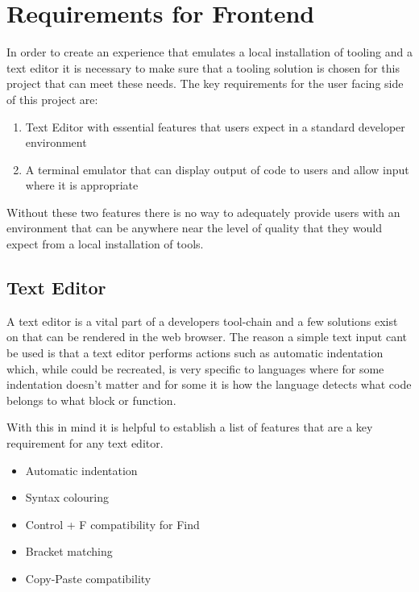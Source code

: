 \section{Requirements for Frontend} \label{solapp-frontend}

In order to create an experience that emulates a local installation of tooling and a text editor it is necessary to make sure that a tooling solution is chosen for this project that can meet these needs. The key requirements for the user facing side of this project are:

\begin{enumerate}
  \item Text Editor with essential features that users expect in a standard developer environment
  \item A terminal emulator that can display output of code to users and allow input where it is appropriate
\end{enumerate}

Without these two features there is no way to adequately provide users with an environment that can be anywhere near the level of quality that they would expect from a local installation of tools.

\subsection{Text Editor}

A text editor is a vital part of a developers tool-chain and a few solutions exist on that can be rendered in the web browser. The reason a simple text input cant be used is that a text editor performs actions such as automatic indentation which, while could be recreated, is very specific to languages where for some indentation doesn't matter and for some it is how the language detects what code belongs to what block or function.

With this in mind it is helpful to establish a list of features that are a key requirement for any text editor.

\begin{itemize}
  \item Automatic indentation
  \item Syntax colouring
  \item Control + F compatibility for Find
  \item Bracket matching
  \item Copy-Paste compatibility
\end{itemize}

